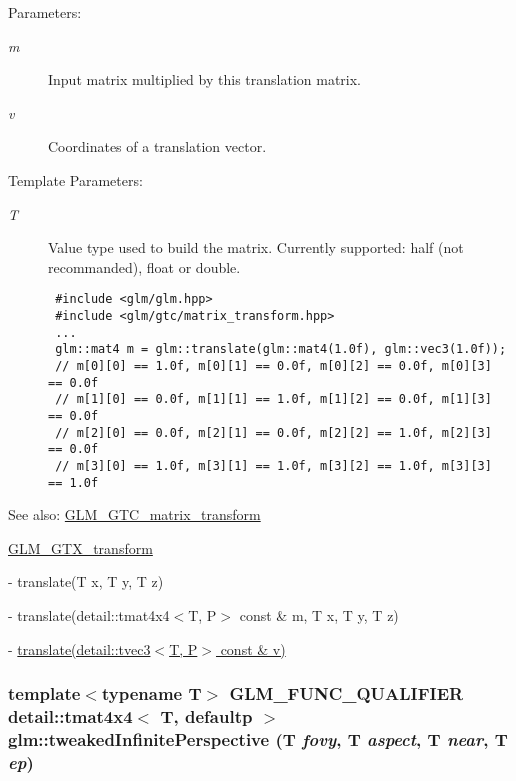 \begin{Desc}
\item[Parameters:]
\begin{description}
\item[{\em m}]Input matrix multiplied by this translation matrix. \item[{\em v}]Coordinates of a translation vector. \end{description}
\end{Desc}
\begin{Desc}
\item[Template Parameters:]
\begin{description}
\item[{\em T}]Value type used to build the matrix. Currently supported: half (not recommanded), float or double. 

\begin{Code}\begin{verbatim} #include <glm/glm.hpp>
 #include <glm/gtc/matrix_transform.hpp>
 ...
 glm::mat4 m = glm::translate(glm::mat4(1.0f), glm::vec3(1.0f));
 // m[0][0] == 1.0f, m[0][1] == 0.0f, m[0][2] == 0.0f, m[0][3] == 0.0f
 // m[1][0] == 0.0f, m[1][1] == 1.0f, m[1][2] == 0.0f, m[1][3] == 0.0f
 // m[2][0] == 0.0f, m[2][1] == 0.0f, m[2][2] == 1.0f, m[2][3] == 0.0f
 // m[3][0] == 1.0f, m[3][1] == 1.0f, m[3][2] == 1.0f, m[3][3] == 1.0f
\end{verbatim}
\end{Code}

 \end{description}
\end{Desc}
\begin{Desc}
\item[See also:]\hyperlink{group__gtc__matrix__transform}{GLM\_\-GTC\_\-matrix\_\-transform} 

\hyperlink{group__gtx__transform}{GLM\_\-GTX\_\-transform} 

- translate(T x, T y, T z) 

- translate(detail::tmat4x4$<$T, P$>$ const \& m, T x, T y, T z) 

- \hyperlink{group__gtx__transform_gc06efbcc43ab431cf6ae1ba0e6f03e86}{translate(detail::tvec3$<$T, P$>$ const \& v)} \end{Desc}
\hypertarget{group__gtc__matrix__transform_gb4748de5e549cbd83682c9d28a9ccdac}{
\subsubsection[tweakedInfinitePerspective]{\setlength{\rightskip}{0pt plus 5cm}template$<$typename T$>$ GLM\_\-FUNC\_\-QUALIFIER detail::tmat4x4$<$ T, defaultp $>$ glm::tweakedInfinitePerspective (T {\em fovy}, \/  T {\em aspect}, \/  T {\em near}, \/  T {\em ep})}}
\label{group__gtc__matrix__transform_gb4748de5e549cbd83682c9d28a9ccdac}


